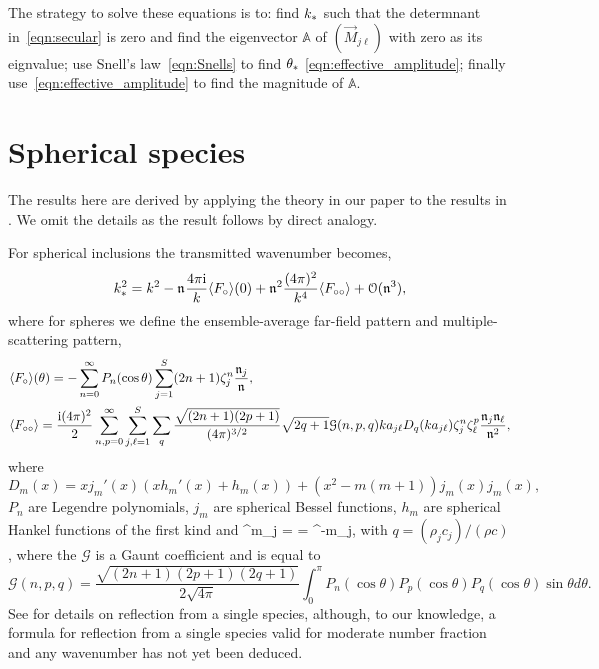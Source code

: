 \documentclass[12pt, a4paper]{article}
\begin{document}
The strategy to solve these equations is to: find $k_*$ such that the determnant in~\eqref{eqn:secular} is zero and find the eigenvector $\mathbb A$ of $(\vec M_{j \ell})$ with zero as its eignvalue; use Snell's law~\eqref{eqn:Snells} to find $\theta_*$ \eqref{eqn:effective_amplitude}; finally use~\eqref{eqn:effective_amplitude} to find the magnitude of $\mathbb A$.   


\section{Spherical species}
\label{sec:Effective3D}

The results here are derived by applying the theory in our paper to the results in \cite{linton_multiple_2006}. We omit the details as the result follows by direct analogy.

For spherical inclusions the transmitted wavenumber becomes,
\begin{align}
   k_*^2 = k^2 -\mathfrak n_{} \frac{4 \pi \textrm{i}}{k}  \langle F_\circ \rangle(0) + \mathfrak n_{}^2 \frac{(4 \pi)^2 }{k^4} \langle F_{\circ\circ} \rangle
   + \mathcal O(\mathfrak n_{}^3),
  \label{eqn:SmallNfracSpheres}
\end{align}
where for spheres we define the ensemble-average far-field pattern and multiple-scattering pattern,
\begin{align}
  &\langle F_\circ \rangle(\theta) = - \sum_{n=0}^\infty P_n (\cos \theta ) \sum_{j=1}^S (2n+1)  \zeta^n_j \frac{\mathfrak n_{j}}{\mathfrak n_{}},
\\
  &\langle F_{\circ\circ} \rangle = \frac{\textrm{i} (4 \pi)^2}{2} \sum_{n,p=0}^\infty \sum_{j,\ell=1}^S \sum_q  \frac{\sqrt{(2n+1)(2p+1)}}{(4 \pi)^{3/2}}  \sqrt{2 q +1} \mathcal G(n,p,q) k a_{j\ell} D_q(k a_{j\ell}) \zeta^n_j \zeta^p_\ell \frac{\mathfrak n_{j} \mathfrak n_{\ell}}{\mathfrak n_{}^2},
\notag
\end{align}
where
\[
D_m(x) = x j_m'(x)( x h_m'(x) + h_m(x)) + (x^2 - m(m+1))j_m(x) j_m(x),
\]
$P_n$ are   Legendre polynomials, $j_m$ are   spherical Bessel functions, $h_m$ are spherical Hankel functions of the first kind  and
\be
\scatZs^m_j =  = \scatZs^{-m}_j,
\label{eqn:Zm}
\en
with $q = (\rho_j c_j)/(\rho c)$, where the $\mathcal G$ is a Gaunt coefficient and is equal to
\[
\mathcal G(n,p,q) = \frac{\sqrt{(2n+1)(2p+1)(2q+1)}}{2 \sqrt{4 \pi}}   \int_0^\pi  P_n(\cos \theta) P_p(\cos \theta) P_q(\cos \theta) \sin \theta d \theta.
\]
See \cite{caleap_effective_2012} for details on reflection from a single species, although, to our knowledge, a formula for reflection from a single species valid for moderate number fraction and any wavenumber has not yet been deduced.

\printbibliography

% 
% 
\end{document}
